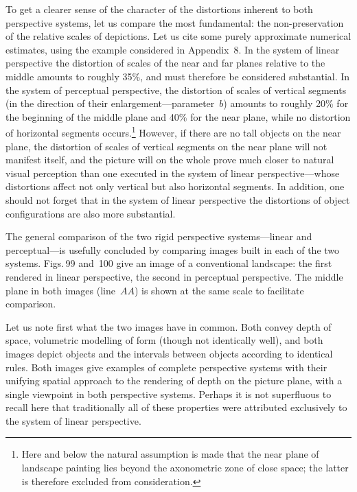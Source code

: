 To get a clearer sense of the character of the distortions inherent to both
perspective systems, let us compare the most fundamental: the non-preservation of
the relative scales of depictions. Let us cite some purely approximate numerical
estimates, using the example considered in Appendix~8. In the system of linear
perspective the distortion of scales of the near and far planes relative to the
middle amounts to roughly 35\%, and must therefore be considered substantial. In the
system of perceptual perspective, the distortion of scales of vertical segments (in
the direction of their enlargement---parameter~$b$) amounts to roughly 20\% for the
beginning of the middle plane and 40\% for the near plane, while no distortion of
horizontal segments occurs.\footnote{Here and below the natural assumption is made
  that the near plane of landscape painting lies beyond the axonometric zone of
  close space; the latter is therefore excluded from consideration.}
However, if there are no tall objects on the near plane, the distortion of scales of
vertical segments on the near plane will not manifest itself, and the picture will
on the whole prove much closer to natural visual perception than one executed in the
system of linear perspective---whose distortions affect not only vertical but also
horizontal segments. In addition, one should not forget that in the system of linear
perspective the distortions of object configurations are also more substantial.


The general comparison of the two rigid perspective systems---linear and
perceptual---is usefully concluded by comparing images built in each of the two
systems. Figs.\,99 and~100 give an image of a conventional landscape: the first
rendered in linear perspective, the second in perceptual perspective. The middle
plane in both images (line~$AA$) is shown at the same scale to facilitate comparison.




Let us note first what the two images have in common. Both convey depth of space,
volumetric modelling of form (though not identically well), and both images depict
objects and the intervals between objects according to identical rules. Both images
give examples of complete perspective systems with their unifying spatial approach
to the rendering of depth on the picture plane, with a single viewpoint in both
perspective systems. Perhaps it is not superfluous to recall here that traditionally
all of these properties were attributed exclusively to the system of linear
perspective.

